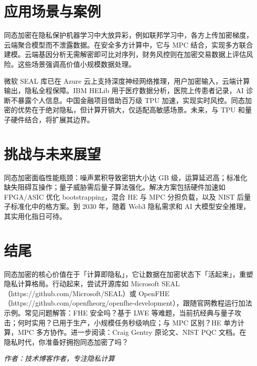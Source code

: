 \chapter{应用场景与案例}
同态加密在隐私保护机器学习中大放异彩，例如联邦学习中，各方上传加密梯度，云端聚合模型而不泄露数据。在安全多方计算中，它与 MPC 结合，实现多方联合建模。云端基因分析无需解密即可比对序列，财务风控则在加密交易数据上评估风险。这些场景强调高价值小规模数据处理。\par
微软 SEAL 库已在 Azure 云上支持深度神经网络推理，用户加密输入，云端计算输出，隐私全程保障。IBM HELib 用于医疗数据分析，医院上传患者记录，AI 诊断不暴露个人信息。中国金融项目借助百万级 TPU 加速，实现实时风控。同态加密的优势在于绝对隐私，但计算开销大，仅适配高敏感场景。未来，与 TPU 和量子硬件结合，将扩展其边界。\par
\chapter{挑战与未来展望}
同态加密面临性能瓶颈：噪声累积导致密钥大小达 GB 级，运算延迟高；标准化缺失阻碍互操作；量子威胁需后量子算法强化。解决方案包括硬件加速如 FPGA/ASIC 优化 bootstrapping，混合 HE 与 MPC 分担负载，以及 NIST 后量子标准化中的格方案。到 2030 年，随着 Web3 隐私需求和 AI 大模型安全推理，其实用化指日可待。\par
\chapter{结尾}
同态加密的核心价值在于「计算即隐私」，它让数据在加密状态下「活起来」，重塑隐私计算格局。行动起来，尝试开源库如 Microsoft SEAL（https://github.com/Microsoft/SEAL）或 OpenFHE（https://github.com/openfheorg/openfhe-development），跟随官网教程运行加法示例。常见问题解答：FHE 安全吗？基于 LWE 等难题，当前抗经典与量子攻击；何时实用？已用于生产，小规模任务秒级响应；与 MPC 区别？HE 单方计算，MPC 多方协作。进一步阅读：Craig Gentry 原论文、NIST PQC 文档。在隐私时代，你准备好拥抱同态加密了吗？\par
\textit{作者：技术博客作者，专注隐私计算}\par
